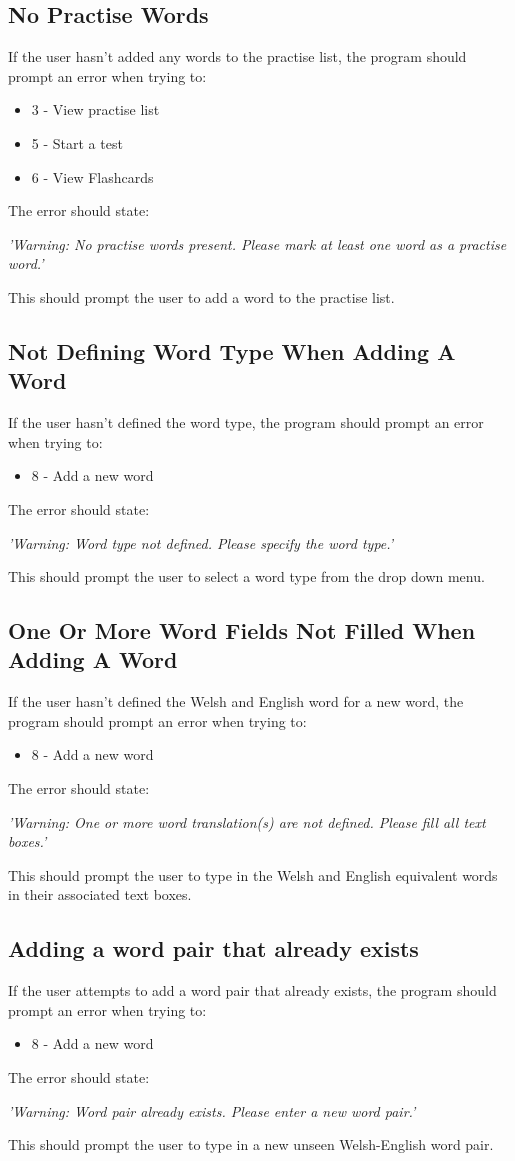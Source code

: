 \documentclass{project}
\begin{document}
\subsection{No Practise Words}
If the user hasn't added any words to the practise list, the program should prompt an error when trying to:
\begin{itemize}
	\item 3 - View practise list
	\item 5 - Start a test
	\item 6 - View Flashcards
	\end{itemize}
The error should state:
\begin{center}
	\emph{'Warning: No practise words present. Please mark at least one word as a practise word.'}
\end{center}
This should prompt the user to add a word to the practise list.
\subsection{Not Defining Word Type When Adding A Word}
If the user hasn't defined the word type, the program should prompt an error when trying to:
\begin{itemize}
	\item 8 - Add a new word
	\end{itemize}
The error should state:
\begin{center}
	\emph{'Warning: Word type not defined. Please specify the word type.'}
\end{center}
This should prompt the user to select a word type from the drop down menu.
\subsection{One Or More Word Fields Not Filled When Adding A Word}
If the user hasn't defined the Welsh and English word for a new word, the program should prompt an error when trying to:
\begin{itemize}
	\item 8 - Add a new word
	\end{itemize}
The error should state:
\begin{center}
	\emph{'Warning: One or more word translation(s) are not defined. Please fill all text boxes.'}
\end{center}
This should prompt the user to type in the Welsh and English equivalent words in their associated text boxes.
\subsection{Adding a word pair that already exists}
If the user attempts to add a word pair that already exists, the program should prompt an error when trying to:
\begin{itemize}
	\item 8 - Add a new word
	\end{itemize}
The error should state:
\begin{center}
	\emph{'Warning: Word pair already exists. Please enter a new word pair.'}
\end{center}
This should prompt the user to type in a new unseen Welsh-English word pair.
\end{document}
